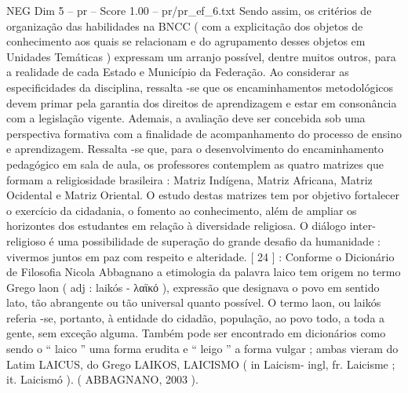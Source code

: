 \begin{textsample}{NEG Dim 5 – pr – Score 1.00 – pr/pr\_ef\_6.txt}
Sendo assim, os critérios de organização das habilidades na BNCC ( com a explicitação dos objetos de conhecimento aos quais se relacionam e do agrupamento desses objetos em Unidades Temáticas ) expressam um arranjo possível, dentre muitos outros, para a realidade de cada Estado e Município da Federação.
Ao considerar as especificidades da disciplina, ressalta -se que os encaminhamentos metodológicos devem primar pela garantia dos direitos de aprendizagem e estar em consonância com a legislação vigente.
Ademais, a avaliação deve ser concebida sob uma perspectiva formativa com a finalidade de acompanhamento do processo de ensino e aprendizagem.
Ressalta -se que, para o desenvolvimento do encaminhamento pedagógico em sala de aula, os professores contemplem as quatro matrizes que formam a religiosidade brasileira : Matriz Indígena, Matriz Africana, Matriz Ocidental e Matriz Oriental.
O estudo destas matrizes tem por objetivo fortalecer o exercício da cidadania, o fomento ao conhecimento, além de ampliar os horizontes dos estudantes em relação à diversidade religiosa.
O diálogo inter-religioso é uma possibilidade de superação do grande desafio da humanidade : vivermos juntos em paz com respeito e alteridade. [ 24 ] : Conforme o Dicionário de Filosofia Nicola Abbagnano a etimologia da palavra laico tem origem no termo Grego laon ( adj : laikós - λαϊκό ), expressão que designava o povo em sentido lato, tão abrangente ou tão universal quanto possível.
O termo laon, ou laikós referia -se, portanto, à entidade do cidadão, população, ao povo todo, a toda a gente, sem exceção alguma.
Também pode ser encontrado em dicionários como sendo o “ laico ” uma forma erudita e “ leigo ” a forma vulgar ; ambas vieram do Latim LAICUS, do Grego LAIKOS, LAICISMO ( in Laicism- ingl, fr.
Laicisme ; it.
Laicismó ). ( ABBAGNANO, 2003 ).

\end{textsample}
